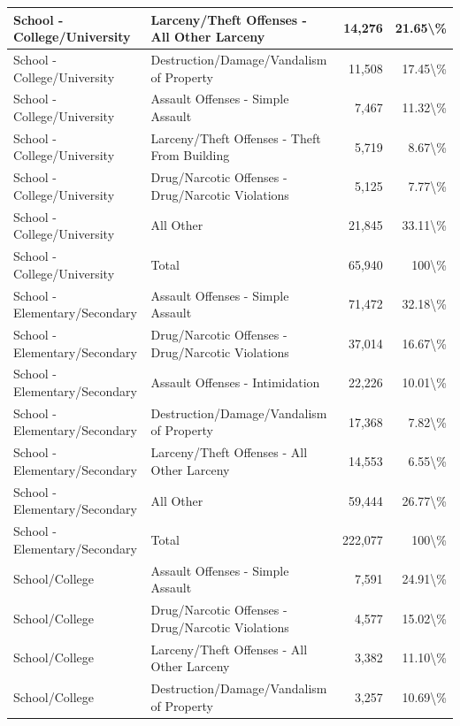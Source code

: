 \documentclass[
]{krantz}
\begin{document}
\begin{longtable}[t]{l|l|r|r}
\hline
School - College/University & Larceny/Theft Offenses - All Other Larceny & 14,276 & 21.65\textbackslash{}\%\\
\hline
School - College/University & Destruction/Damage/Vandalism of Property & 11,508 & 17.45\textbackslash{}\%\\
\hline
School - College/University & Assault Offenses - Simple Assault & 7,467 & 11.32\textbackslash{}\%\\
\hline
School - College/University & Larceny/Theft Offenses - Theft From Building & 5,719 & 8.67\textbackslash{}\%\\
\hline
School - College/University & Drug/Narcotic Offenses - Drug/Narcotic Violations & 5,125 & 7.77\textbackslash{}\%\\
\hline
School - College/University & All Other & 21,845 & 33.11\textbackslash{}\%\\
\hline
School - College/University & Total & 65,940 & 100\textbackslash{}\%\\
\hline
School - Elementary/Secondary & Assault Offenses - Simple Assault & 71,472 & 32.18\textbackslash{}\%\\
\hline
School - Elementary/Secondary & Drug/Narcotic Offenses - Drug/Narcotic Violations & 37,014 & 16.67\textbackslash{}\%\\
\hline
School - Elementary/Secondary & Assault Offenses - Intimidation & 22,226 & 10.01\textbackslash{}\%\\
\hline
School - Elementary/Secondary & Destruction/Damage/Vandalism of Property & 17,368 & 7.82\textbackslash{}\%\\
\hline
School - Elementary/Secondary & Larceny/Theft Offenses - All Other Larceny & 14,553 & 6.55\textbackslash{}\%\\
\hline
School - Elementary/Secondary & All Other & 59,444 & 26.77\textbackslash{}\%\\
\hline
School - Elementary/Secondary & Total & 222,077 & 100\textbackslash{}\%\\
\hline
School/College & Assault Offenses - Simple Assault & 7,591 & 24.91\textbackslash{}\%\\
\hline
School/College & Drug/Narcotic Offenses - Drug/Narcotic Violations & 4,577 & 15.02\textbackslash{}\%\\
\hline
School/College & Larceny/Theft Offenses - All Other Larceny & 3,382 & 11.10\textbackslash{}\%\\
\hline
School/College & Destruction/Damage/Vandalism of Property & 3,257 & 10.69\textbackslash{}\%\\

\end{longtable}
\end{document}
